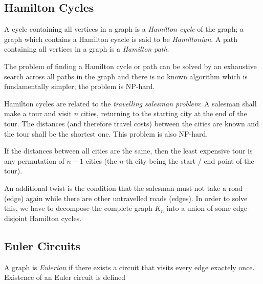 
\subsection{Hamilton Cycles}

A cycle containing all vertices in a graph is a \emph{Hamilton cycle} of the graph; a graph which contains a Hamilton cyacle is said to be \emph{Hamiltonian}. A path containing all vertices in a graph is a \emph{Hamilton path}.

The problem of finding a Hamilton cycle or path can be solved by an exhaustive search across all paths in the graph and there is no known algorithm which is fundamentally simpler; the problem is NP-hard.

Hamilton cycles are related to the \emph{travelling salesman problem}: A salesman shall make a tour and visit $n$ cities, returning to the starting city at the end of the tour. The distances (and therefore travel costs) between the cities are known and the tour shall be the shortest one. This problem is also NP-hard.

If the distances between all cities are the same, then the least expensive tour is any permutation of $n-1$ cities (the $n$-th city being the start / end point of the tour).

An additional twist is the condition that the salesman must not take a road (edge) again while there are other untravelled roads (edges). In order to solve this, we have to decompose the complete graph $K_n$ into a union of some edge-disjoint Hamilton cycles. 


\subsection{Euler Circuits}

A graph is \emph{Eulerian} if there exists a circuit that visits every edge exactely once. Existence of an Euler circuit is defined 



